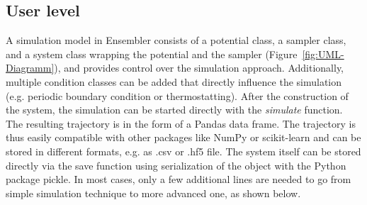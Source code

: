 \subsection{User level}
 A simulation model in Ensembler consists of a potential class, a sampler class, and a system class wrapping the potential and the sampler (Figure~\ref{fig:UML-Diagramm}), and provides control over the simulation approach. 
Additionally, multiple condition classes can be added that directly influence the simulation (e.g. periodic boundary condition\cite{Cheatham1995, Leach2001} or  thermostatting\cite{Andersen1980}). 
After the construction of the system, the simulation can be started directly with the \textit{simulate} function. 
The resulting trajectory is in the form of a Pandas data frame.\cite{Mckinney2010} The trajectory is thus easily compatible with other packages like NumPy\cite{VanDerWalt2011} or scikit-learn\cite{scikit-learn} and can be stored in different formats, e.g. as .csv or .hf5 file. The system itself can be stored directly via the save function using serialization of the object with the Python package pickle.
In most cases, only a few additional lines are needed to go from simple simulation technique to more advanced one, as shown below. 


